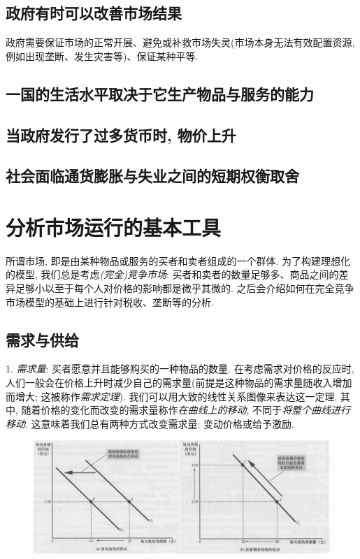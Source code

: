 \subsection*{政府有时可以改善市场结果}

政府需要保证市场的正常开展、避免或补救市场失灵(市场本身无法有效配置资源, 例如出现垄断、发生灾害等)、保证某种平等. 

\subsection*{一国的生活水平取决于它生产物品与服务的能力}

\subsection*{当政府发行了过多货币时, 物价上升}

\subsection*{社会面临通货膨胀与失业之间的短期权衡取舍}

\newpage
\section{分析市场运行的基本工具}

所谓市场, 即是由某种物品或服务的买者和卖者组成的一个群体. 为了构建理想化的模型, 我们总是考虑\textit{(完全)竞争市场}: 买者和卖者的数量足够多、商品之间的差异足够小以至于每个人对价格的影响都是微乎其微的. 之后会介绍如何在完全竞争市场模型的基础上进行针对税收、垄断等的分析. 

\subsection{需求与供给}

1. \textit{需求量}: 买者愿意并且能够购买的一种物品的数量. 在考虑需求对价格的反应时, 人们一般会在价格上升时减少自己的需求量(前提是这种物品的需求量随收入增加而增大; 这被称作\textit{需求定理}). 我们可以用大致的线性关系图像来表达这一定理. 其中, 随着价格的变化而改变的需求量称作\textit{在曲线上的移动}, 不同于\textit{将整个曲线进行移动}. 这意味着我们总有两种方式改变需求量: 变动价格或给予激励. 

\begin{figure}[H]
	\centering
	\includegraphics[width=18cm]{attachment/Fig4_2.png}
\end{figure}

